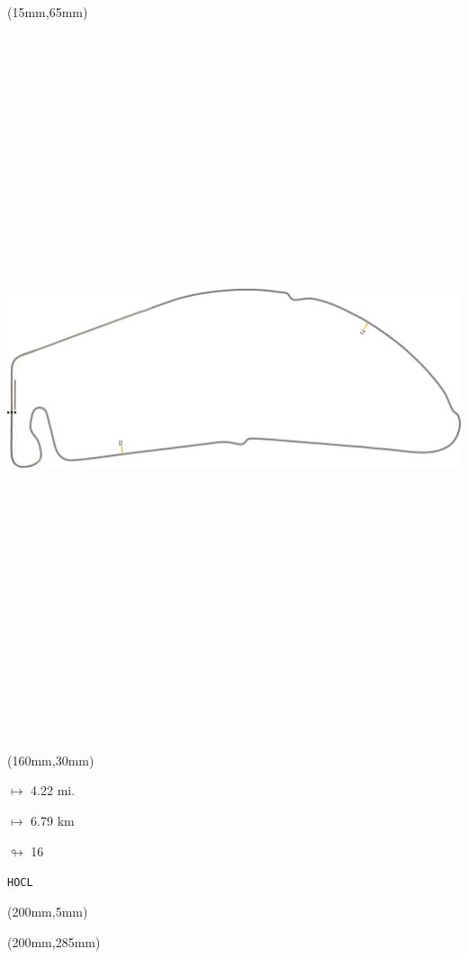 \begin{textblock*}{185mm}(15mm,65mm)%
\centering
\mbox{\includegraphics[width=185mm,height=210mm,keepaspectratio]{PT/HOCL.pdf}}
\end{textblock*}
\begin{textblock*}{40mm}(160mm,30mm)%
\Large
\par$\mapsto$ 4.22 mi.
\par$\mapsto$ 6.79 km
\par$\looparrowright$ 16
\par\hfill\tiny\tt HOCL\\
\end{textblock*}
\begin{textblock*}{20mm}(200mm,5mm)%
\fbox{\thepage}
\label{HOCL}
\end{textblock*}
\begin{textblock*}{20mm}(200mm,285mm)%
\fbox{\thepage}
\end{textblock*}

